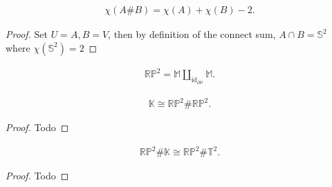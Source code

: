 
\begin{corollary}

\begin{align*}  
\chi(A \# B) = \chi(A) + \chi(B) - 2
.\end{align*}

\end{corollary}

\begin{proof}

Set \(U= A, B=V\), then by definition of the connect sum,
\(A\cap B = {\mathbb{S}}^2\) where \(\chi({\mathbb{S}}^2) = 2\)

\end{proof}

\begin{proposition}[Decomposing $\RP^2$]

\begin{align*}  
{\mathbb{RP}}^2 = {\mathbb{M}}{\coprod}_{\operatorname{id}_{{{\partial}}{\mathbb{M}}}} {\mathbb{M}}
.\end{align*}

\end{proposition}

\begin{proposition}

\begin{align*}  
{\mathbb{K}}\cong {\mathbb{RP}}^2 \# {\mathbb{RP}}^2
.\end{align*}

\end{proposition}

\begin{proof}

Todo

\end{proof}


\begin{proposition}

\begin{align*}  
{\mathbb{RP}}^2 \# {\mathbb{K}}\cong {\mathbb{RP}}^2 \# {\mathbb{T}}^2
.\end{align*}

\end{proposition}

\begin{proof}

Todo

\end{proof}

